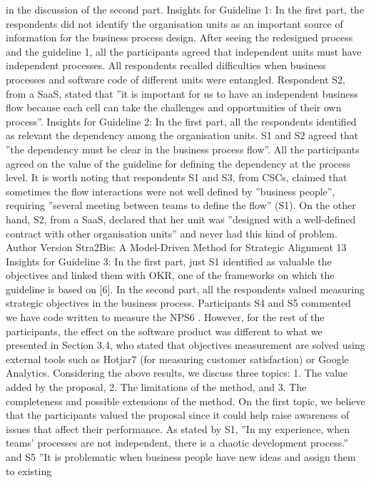 in the discussion of the second part.
Insights for Guideline 1: In the first part, the respondents did not identify
the organisation units as an important source of information for the business
process design. After seeing the redesigned process and the guideline 1, all the
participants agreed that independent units must have independent processes.
All respondents recalled difficulties when business processes and software code
of different units were entangled. Respondent S2, from a SaaS, stated that ”it
is important for us to have an independent business flow because each cell can
take the challenges and opportunities of their own process”.
Insights for Guideline 2: In the first part, all the respondents identified as
relevant the dependency among the organisation units. S1 and S2 agreed that
”the dependency must be clear in the business process flow”. All the participants
agreed on the value of the guideline for defining the dependency at the process
level. It is worth noting that respondents S1 and S3, from CSCs, claimed that
sometimes the flow interactions were not well defined by ”business people”, requiring ”several meeting between teams to define the flow” (S1). On the other
hand, S2, from a SaaS, declared that her unit was ”designed with a well-defined
contract with other organisation units” and never had this kind of problem.
Author Version
Stra2Bis: A Model-Driven Method for Strategic Alignment 13
Insights for Guideline 3: In the first part, just S1 identified as valuable the objectives and linked them with OKR, one of the frameworks on which the guideline
is based on [6]. In the second part, all the respondents valued measuring strategic
objectives in the business process. Participants S4 and S5 commented we have
code written to measure the NPS6
. However, for the rest of the participants, the
effect on the software product was different to what we presented in Section 3.4,
who stated that objectives measurement are solved using external tools such as
Hotjar7
(for measuring customer satisfaction) or Google Analytics.
Considering the above results, we discuss three topics: 1. The value added
by the proposal, 2. The limitations of the method, and 3. The completeness and
possible extensions of the method. On the first topic, we believe that the participants valued the proposal since it could help raise awareness of issues that
affect their performance. As stated by S1, ”In my experience, when teams’ processes are not independent, there is a chaotic development process.” and S5 ”It
is problematic when business people have new ideas and assign them to existing
